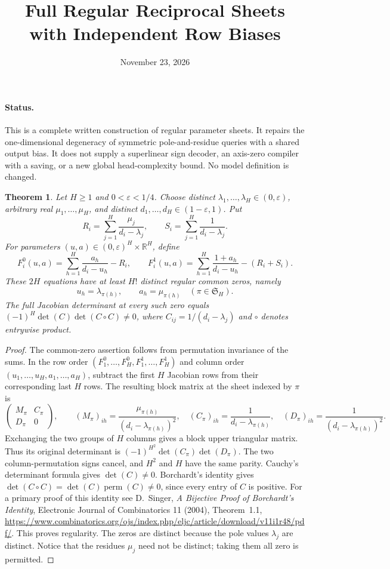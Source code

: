\documentclass[11pt]{article}
\title{Full Regular Reciprocal Sheets with Independent Row Biases}
\author{}
\date{November 23, 2026}
\newtheorem{theorem}{Theorem}
\begin{document}
\maketitle

\paragraph{Status.}
This is a complete written construction of regular parameter sheets.
It repairs the one-dimensional degeneracy of symmetric pole-and-residue
queries with a shared output bias. It does not supply a superlinear
sign decoder, an axis-zero compiler with a saving, or a new global
head-complexity bound. No model definition is changed.

\begin{theorem}
Let $H\geq1$ and $0<\varepsilon<1/4$. Choose distinct
$\lambda_1,\ldots,\lambda_H\in(0,\varepsilon)$, arbitrary real
$\mu_1,\ldots,\mu_H$, and distinct
$d_1,\ldots,d_H\in(1-\varepsilon,1)$. Put
\[
 R_i=\sum_{j=1}^H\frac{\mu_j}{d_i-\lambda_j},\qquad
 S_i=\sum_{j=1}^H\frac1{d_i-\lambda_j}.
\]
For parameters $(u,a)\in(0,\varepsilon)^H\times\mathbb R^H$, define
\[
 F_i^0(u,a)=\sum_{h=1}^H\frac{a_h}{d_i-u_h}-R_i,
 \qquad
 F_i^1(u,a)=\sum_{h=1}^H\frac{1+a_h}{d_i-u_h}-(R_i+S_i).
\]
These $2H$ equations have at least $H!$ distinct regular common zeros,
namely
\[
 u_h=\lambda_{\pi(h)},\qquad a_h=\mu_{\pi(h)}
 \quad (\pi\in\mathfrak S_H).
\]
The full Jacobian determinant at every such zero equals
$(-1)^H\det(C)\det(C\circ C)\neq0$, where
$C_{ij}=1/(d_i-\lambda_j)$ and $\circ$ denotes entrywise product.
\end{theorem}
\begin{proof}
The common-zero assertion follows from permutation invariance of the
sums. In the row order $(F_1^0,\ldots,F_H^0,F_1^1,\ldots,F_H^1)$
and column order $(u_1,\ldots,u_H,a_1,\ldots,a_H)$, subtract the
first $H$ Jacobian rows from their corresponding last $H$ rows.
The resulting block matrix at the sheet indexed by $\pi$ is
\[
 \begin{pmatrix}M_\pi&C_\pi\\D_\pi&0\end{pmatrix},\qquad
 (M_\pi)_{ih}=\frac{\mu_{\pi(h)}}{(d_i-\lambda_{\pi(h)})^2},
 \quad (C_\pi)_{ih}=\frac1{d_i-\lambda_{\pi(h)}},
 \quad (D_\pi)_{ih}=\frac1{(d_i-\lambda_{\pi(h)})^2}.
\]
Exchanging the two groups of $H$ columns gives a block upper triangular
matrix. Thus its original determinant is
$(-1)^{H^2}\det(C_\pi)\det(D_\pi)$.
The two column-permutation signs cancel, and $H^2$ and $H$ have the
same parity. Cauchy's determinant formula gives $\det(C)\neq0$.
Borchardt's identity gives
$\det(C\circ C)=\det(C)\operatorname{perm}(C)\neq0$, since every
entry of $C$ is positive. For a primary proof of this identity see
D.~Singer, \emph{A Bijective Proof of Borchardt's Identity},
Electronic Journal of Combinatorics 11 (2004), Theorem~1.1,
\url{https://www.combinatorics.org/ojs/index.php/eljc/article/download/v11i1r48/pdf/}.
This proves regularity. The zeros are distinct because the pole values
$\lambda_j$ are distinct. Notice that the residues $\mu_j$ need not
be distinct; taking them all zero is permitted.
\end{proof}
\end{document}
